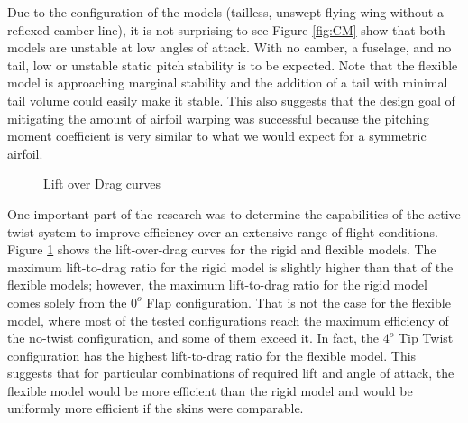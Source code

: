 \documentclass[11pt]{ucthesis}
\begin{document}
Due to the configuration of the models (tailless, unswept flying wing without a reflexed camber line), it is not surprising to see Figure \ref{fig:CM} show that both models are unstable at low angles of attack. With no camber, a fuselage, and no tail, low or unstable static pitch stability is to be expected. Note that the flexible model is approaching marginal stability and the addition of a tail with minimal tail volume could easily make it stable. This also suggests that the design goal of mitigating the amount of airfoil warping was successful because the pitching moment coefficient is very similar to what we would expect for a symmetric airfoil.
\begin{figure}[thpb]
\hfill
{}
\hfill
{}
\hfill
\caption{Lift over Drag curves}
\label{fig:LD}
\end{figure}
One important part of the research was to determine the capabilities of the active twist system to improve efficiency over an extensive range of flight conditions. Figure \ref{fig:LD} shows the lift-over-drag curves for the rigid and flexible models. The maximum lift-to-drag ratio for the rigid model is slightly higher than that of the flexible models; however, the maximum lift-to-drag ratio for the rigid model comes solely from the $0^o$ Flap configuration. That is not the case for the flexible model, where most of the tested configurations reach the maximum efficiency of the no-twist configuration, and some of them exceed it. In fact, the $4^o$ Tip Twist configuration has the highest lift-to-drag ratio for the flexible model. This suggests that for particular combinations of required lift and angle of attack, the flexible model would be more efficient than the rigid model and would be uniformly more efficient if the skins were comparable.
\end{document}
